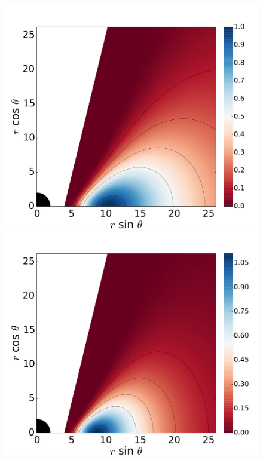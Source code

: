 \documentclass[twocolumn,aps,showpacs,showkeys,prd,superscriptaddress,byrevtex, amsmath]{revtex4-1}
\begin{document}
\begin{figure}
\centering
\includegraphics[scale=0.14]{figures/fig9_0_10.pdf}
\hspace{-0.3cm}
\includegraphics[scale=0.14]{figures/fig9_0_1.pdf}
\hspace{-0.2cm}

\end{figure}
\end{document}
